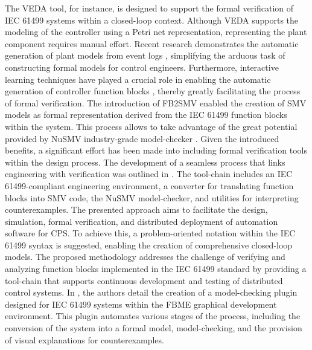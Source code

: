 \begin{bibunit}
The VEDA tool, for instance, is designed to support the formal verification of IEC 61499 systems within a closed-loop context. Although VEDA supports the modeling of the controller using a Petri net representation, representing the plant component requires manual effort. 
Recent research demonstrates the automatic generation of plant models from event logs \cite{xavier2022plant, xavier2022process}, simplifying the arduous task of constructing formal models for control engineers. Furthermore, interactive learning techniques have played a crucial role in enabling the automatic generation of controller function blocks \cite{xavier2022interactive}, thereby greatly facilitating the process of formal verification.
The introduction of FB2SMV \cite{fb2smv} enabled the creation of SMV models as formal representation derived from the IEC 61499 function blocks within the system. 
This process allows to take advantage of the great potential provided by NuSMV industry-grade model-checker \cite{Cimatti2002}.
Given the introduced benefits, a significant effort has been made into including formal verification tools within the design process.
The development of a seamless process that links engineering with verification was outlined in \cite{xavier2021}. The tool-chain includes an IEC 61499-compliant engineering environment, a converter for translating function blocks into SMV code, the NuSMV model-checker, and utilities for interpreting counterexamples. The presented approach aims to facilitate the design, simulation, formal verification, and distributed deployment of automation software for CPS. To achieve this, a problem-oriented notation within the IEC 61499 syntax is suggested, enabling the creation of comprehensive closed-loop models. 
The proposed methodology addresses the challenge of verifying and analyzing function blocks implemented in the IEC 61499 standard by providing a tool-chain that supports continuous development and testing of distributed control systems.
In \cite{liakh2022formal}, the authors detail the creation of a model-checking plugin designed for IEC 61499 systems within the FBME \cite{FBME} graphical development environment. This plugin automates various stages of the process, including the conversion of the system into a formal model, model-checking, and the provision of visual explanations for counterexamples.


\end{bibunit}
